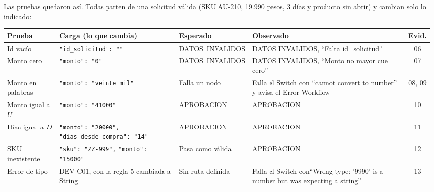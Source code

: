 \documentclass{article}
\begin{document}
\begin{center}
\end{center}

Las pruebas quedaron así. Todas parten de una solicitud válida (SKU AU-210, 19.990 pesos,
3 días y producto sin abrir) y cambian solo lo indicado:

\begin{center}
\footnotesize
\begin{tabular}{>{\raggedright\arraybackslash}p{2.4cm}
                >{\raggedright\arraybackslash}p{3.9cm}
                >{\raggedright\arraybackslash}p{2.8cm}
                >{\raggedright\arraybackslash}p{3.7cm}c}
\toprule
Prueba & Carga (lo que cambia) & Esperado & Observado & Evid. \\
\midrule
Id vacío & \verb|"id_solicitud": ""| & \mbox{DATOS INVALIDOS} & DATOS INVALIDOS, ``Falta id\_solicitud'' & 06 \\
\addlinespace
Monto cero & \verb|"monto": "0"| & \mbox{DATOS INVALIDOS} & DATOS INVALIDOS, ``Monto no mayor que cero'' & 07 \\
\addlinespace
Monto en palabras & \verb|"monto": "veinte mil"| & Falla un nodo & Falla el Switch con ``cannot convert to number'' y avisa el Error Workflow & 08, 09 \\
\addlinespace
Monto igual a $U$ & \verb|"monto": "41000"| & APROBACION & APROBACION & 10 \\
\addlinespace
Días igual a $D$ & \verb|"monto": "20000",| \newline \verb|"dias_desde_compra": "14"| & APROBACION & APROBACION & 11 \\
\addlinespace
SKU inexistente & \verb|"sku": "ZZ-999",| \newline \verb|"monto": "15000"| & Pasa como válida & APROBACION & 12 \\
\addlinespace
Error de tipo & DEV-C01, con la regla 5 cambiada a String & Sin ruta definida & Falla el Switch con\newline ``Wrong type: '9990' is a number but was expecting a string'' & 13 \\
\bottomrule
\end{tabular}
\end{center}
\end{document}
